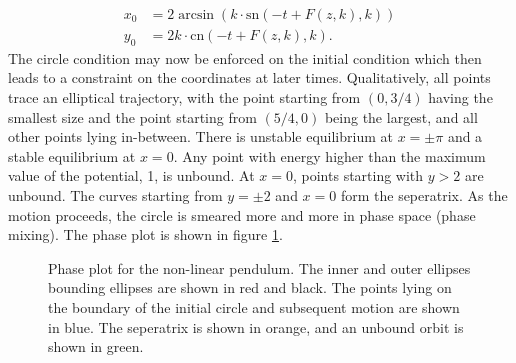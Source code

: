 \begin{enumerate}
\begin{enumerate}
\begin{align}
	x_0 &= 2\arcsin(k\cdot\mathrm{sn}(-t+F(z,k),k))\\
	y_0 &= 2k\cdot\mathrm{cn}(-t + F(z,k),k).
\end{align}
The circle condition may now be enforced on the initial condition which then leads to a constraint on the coordinates at later times. Qualitatively, all points trace an elliptical trajectory, with the point starting from $(0,3/4)$ having the smallest size and the point starting from $(5/4,0)$ being the largest, and all other points lying in-between. There is unstable equilibrium at $x = \pm \pi$ and a stable equilibrium at $x=0$. Any point with energy higher than the maximum value of the potential, 1, is unbound. At $x = 0$, points starting with $y>2$ are unbound. The curves starting from $y =\pm2$ and $x = 0$ form the seperatrix. As the motion proceeds, the circle is smeared more and more in phase space (phase mixing). The phase plot is shown in figure \ref{FIGURE LABEL}.
\begin{figure}[!h]
	\centering
	
	\caption{Phase plot for the non-linear pendulum. The inner and outer ellipses bounding ellipses are shown in red and black. The points lying on the boundary of the initial circle and subsequent motion are shown in blue. The seperatrix is shown in orange, and an unbound orbit is shown in green.}
	\label{FIGURE LABEL}
\end{figure}

\end{enumerate}
\end{enumerate}
